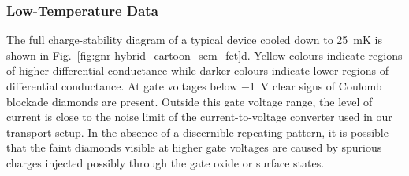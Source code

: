 %
\subsubsection{Low-Temperature Data}
The full charge-stability diagram of a typical device cooled down to \SI{25}{\milli\kelvin} is shown in Fig.~\ref{fig:gnr-hybrid_cartoon_sem_fet}d. Yellow colours indicate regions of higher differential conductance while darker colours indicate lower regions of differential conductance. At gate voltages below \SI{-1}{\volt} clear signs of Coulomb blockade diamonds are present. Outside this gate voltage range, the level of current is close to the noise limit of the current-to-voltage converter used in our transport setup. In the absence of a discernible repeating pattern, it is possible that the faint diamonds visible at higher gate voltages are caused by spurious charges injected possibly through the gate oxide or surface states.


